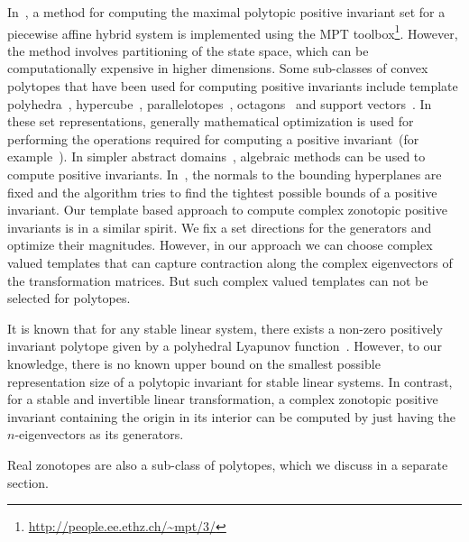 In~\cite{rakovic2004computation}, a method for computing the maximal
polytopic positive invariant set for a piecewise affine hybrid system
is implemented using the MPT
toolbox\footnote{\url{http://people.ee.ethz.ch/~mpt/3/}}.  However,
the method involves partitioning of the state space, which can be
computationally expensive in higher dimensions.  Some sub-classes of
convex polytopes that have been used for computing positive invariants
include template
polyhedra~\cite{Gawlitza,Sankaranarayanan+Dang+Ivancic-08-Symbolic},
hypercube~\cite{cousot1976static,tiwari2008generating},
parallelotopes~\cite{amato2012abstract},
octagons~\cite{DBLP:journals/lisp/Mine06} and support
vectors~\cite{FLD+11}. In these set representations, generally
mathematical optimization is used for performing the operations
required for computing a positive invariant~(for
example~\cite{Gawlitza,dang1998reachability}).  In simpler abstract
domains~\cite{DBLP:journals/lisp/Mine06,cousot1976static,amato2012abstract},
algebraic methods can be used to compute positive invariants.
In~\cite{Gawlitza}, the normals to the bounding hyperplanes are fixed
and the algorithm tries to find the tightest possible bounds
of a positive invariant.  Our template based approach to
compute complex zonotopic positive invariants is in a similar spirit.
We fix a set directions for the generators and optimize their
magnitudes.  However, in our approach we can choose complex valued
templates that can capture contraction along the complex eigenvectors
of the transformation matrices.  But such complex valued templates can
not be selected for polytopes.

It is known that for any stable linear system, there exists a non-zero
positively invariant polytope given by a polyhedral Lyapunov
function~\cite{blanchini2008set}.  However, to our knowledge, there is
no known upper bound on the smallest possible representation size of a
polytopic invariant for stable linear systems.  In contrast, for a stable and
invertible linear transformation, a complex zonotopic positive
invariant containing the origin in its interior can be computed by
just having the $n$-eigenvectors as its generators.

Real zonotopes are also a sub-class of polytopes, which we discuss in
a separate section.

          
